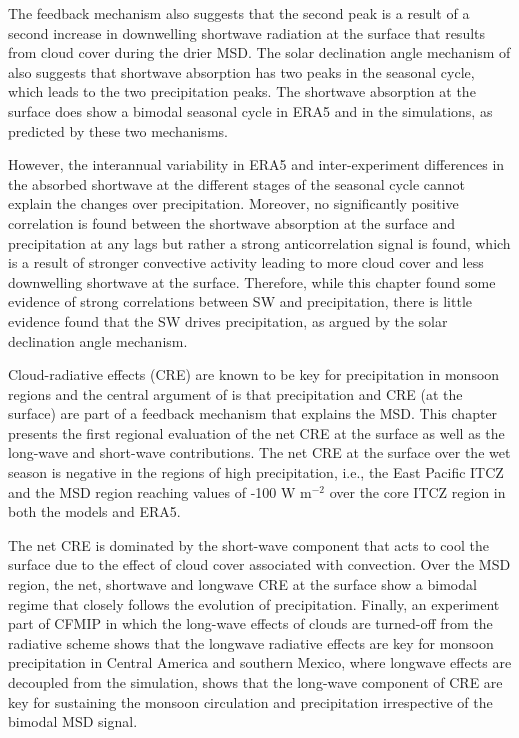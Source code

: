  
The feedback mechanism also suggests that the second peak is a result of a second increase in downwelling shortwave radiation at the surface that results from cloud cover during the drier MSD.
The solar declination angle mechanism of \cite{karnauskas2013} also suggests that shortwave absorption has two peaks in the seasonal cycle, which leads to the two precipitation peaks. The shortwave absorption at the surface does show a bimodal seasonal cycle in ERA5 and in the simulations, as predicted by these two mechanisms.

 However, the interannual variability in ERA5 and inter-experiment differences in the absorbed shortwave at the different stages of the seasonal cycle cannot explain the changes over precipitation. Moreover, no significantly positive correlation is found between the shortwave absorption at the surface and precipitation at any lags but rather a strong anticorrelation signal is found, which is a result of stronger convective activity leading to more cloud cover and less downwelling shortwave at the surface. 
 Therefore, while this chapter found some evidence of strong correlations between SW and precipitation, there is little evidence found that the SW drives precipitation, as argued by the solar declination angle mechanism.

Cloud-radiative effects (CRE) are known to be key for precipitation in monsoon regions and the central argument of \cite{magana1999} is that precipitation and CRE (at the surface) are part of a feedback mechanism that explains the MSD. This chapter presents the first regional evaluation of the net CRE at the surface as well as the long-wave and short-wave contributions. The net CRE at the surface over the wet season is negative in the regions of high precipitation, i.e., the East Pacific ITCZ and the MSD region reaching values of -100 W m$^{-2}$ over the core ITCZ region in both the models and ERA5.

 The net CRE is dominated by the short-wave component that acts to cool the surface due to the effect of cloud cover associated with convection. Over the MSD region, the net, shortwave and longwave CRE at the surface show a bimodal regime that closely follows the evolution of precipitation. Finally, an experiment part of CFMIP in which the long-wave effects of clouds are turned-off from the radiative scheme shows that the longwave radiative effects are key for monsoon precipitation in Central America and southern Mexico,  where longwave effects are decoupled from the simulation, shows that the long-wave component of CRE are key for sustaining the monsoon circulation and precipitation irrespective of the bimodal MSD signal.

